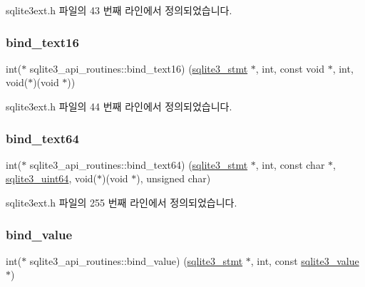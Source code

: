 sqlite3ext.\+h 파일의 43 번째 라인에서 정의되었습니다.

\mbox{\label{structsqlite3__api__routines_ab6ad28704caf8337cf5a395154e8941c}} 
\subsubsection{\texorpdfstring{bind\+\_\+text16}{bind\_text16}}
{\footnotesize\ttfamily int($\ast$ sqlite3\+\_\+api\+\_\+routines\+::bind\+\_\+text16) (\hyperlink{sqlite3_8h_af2a033da1327cdd77f0a174a09aedd0c}{sqlite3\+\_\+stmt} $\ast$, int, const void $\ast$, int, void($\ast$)(void $\ast$))}



sqlite3ext.\+h 파일의 44 번째 라인에서 정의되었습니다.

\mbox{\label{structsqlite3__api__routines_aab0cca7b94c71fa0e335cdbb17820ab5}} 
\subsubsection{\texorpdfstring{bind\+\_\+text64}{bind\_text64}}
{\footnotesize\ttfamily int($\ast$ sqlite3\+\_\+api\+\_\+routines\+::bind\+\_\+text64) (\hyperlink{sqlite3_8h_af2a033da1327cdd77f0a174a09aedd0c}{sqlite3\+\_\+stmt} $\ast$, int, const char $\ast$, \hyperlink{sqlite3_8h_a181c20ecfd72bc6627635746d382c610}{sqlite3\+\_\+uint64}, void($\ast$)(void $\ast$), unsigned char)}



sqlite3ext.\+h 파일의 255 번째 라인에서 정의되었습니다.

\mbox{\label{structsqlite3__api__routines_a8f3424b59d6bbc836c233a44a2fd9a36}} 
\subsubsection{\texorpdfstring{bind\+\_\+value}{bind\_value}}
{\footnotesize\ttfamily int($\ast$ sqlite3\+\_\+api\+\_\+routines\+::bind\+\_\+value) (\hyperlink{sqlite3_8h_af2a033da1327cdd77f0a174a09aedd0c}{sqlite3\+\_\+stmt} $\ast$, int, const \hyperlink{sqlite3_8h_ac2fa1ecdb2290d9af6010edbd1cbc83c}{sqlite3\+\_\+value} $\ast$)}



